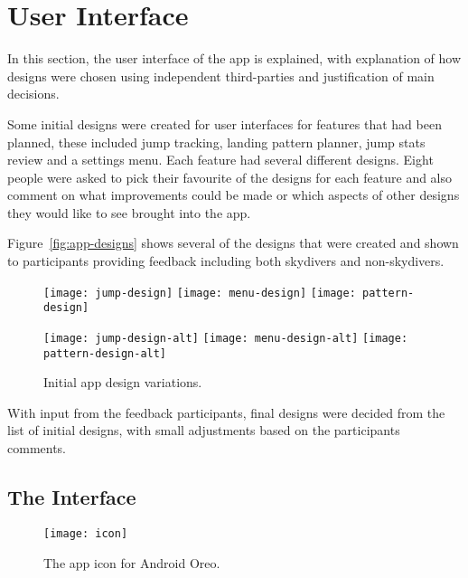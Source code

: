 \section{User Interface}\label{sec:user-interface}
In this section, the user interface of the app is explained, with explanation of how designs were chosen using independent third-parties and justification of main decisions.

Some initial designs were created for user interfaces for features that had been planned, these included jump tracking, landing pattern planner, jump stats review and a settings menu. Each feature had several different designs. Eight people were asked to pick their favourite of the designs for each feature and also comment on what improvements could be made or which aspects of other designs they would like to see brought into the app.

Figure~\vref{fig:app-designs} shows several of the designs that were created and shown to participants providing feedback including both skydivers and non-skydivers.

\begin{figure}[ht]
  \centering
  \texttt{[image: jump-design]}
  \hspace{1cm}
  \texttt{[image: menu-design]}
  \hspace{1cm}
  \texttt{[image: pattern-design]}

  \texttt{[image: jump-design-alt]}
  \hspace{1cm}
  \texttt{[image: menu-design-alt]}
  \hspace{1cm}
  \texttt{[image: pattern-design-alt]}
  \caption{Initial app design variations.}\label{fig:app-designs}
\end{figure}

With input from the feedback participants, final designs were decided from the list of initial designs, with small adjustments based on the participants comments.

\subsection{The Interface}

\begin{wrapfigure}{}{0.2\textwidth}
  \centering
  \texttt{[image: icon]}
  \caption{The app icon for Android Oreo.}\label{fig:icon}
\end{wrapfigure}


